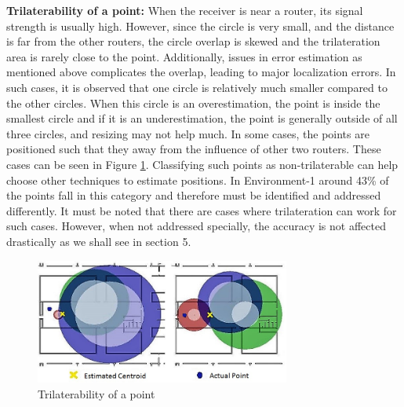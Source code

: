 \documentclass[twocolumn]{svjour3}
\begin{document}
\textbf{Trilaterability of a point:} When the receiver is near a router, its signal strength is usually high. However, since the circle is very small, and the distance is far from the other routers, the circle overlap is skewed and the trilateration area is rarely close to the point. 
Additionally, issues in error estimation as mentioned above complicates the overlap, leading to major localization errors. In such cases, it is observed that one circle is relatively much smaller compared to the other circles. When this circle is an overestimation, the point is inside the smallest circle and if it is an underestimation, the point is generally outside of all three circles, and resizing may not help much. In some cases, the points are positioned such that they  away from the influence of other two routers. These cases can be seen in Figure \ref{collageofpoints}. Classifying such points as non-trilaterable can help choose other techniques to estimate positions. In Environment-1 around 43\% of the points fall in this category and therefore must be identified and addressed differently. It must be noted that there are cases where trilateration can work for such cases. However, when not addressed specially, the accuracy is not affected drastically as we shall see in section 5.

\begin{figure}[t]
\centering
\includegraphics[width=84mm]{Anomalous_Centroid_Edited.jpg}
\caption{ Trilaterability of a point}
\label{collageofpoints}
\end{figure}
\end{document}

